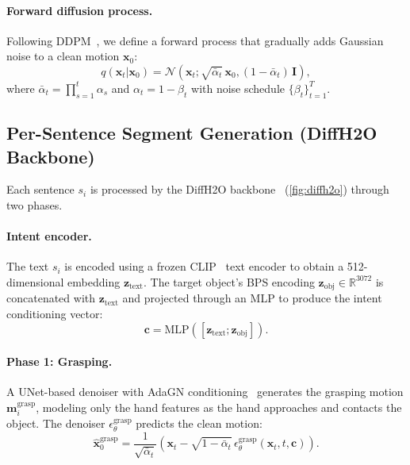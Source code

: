 \documentclass[runningheads]{llncs}
\newcommand{\bx}{\mathbf{x}}
\newcommand{\bc}{\mathbf{c}}
\newcommand{\bz}{\mathbf{z}}
\newcommand{\bm}{\mathbf{m}}
\begin{document}
\paragraph{Forward diffusion process.}
Following DDPM~\cite{ho2020denoising}, we define a forward process that gradually adds Gaussian noise to a clean motion $\bx_0$:
\begin{equation}
    q(\bx_t | \bx_0) = \mathcal{N}(\bx_t; \sqrt{\bar{\alpha}_t}\, \bx_0, (1 - \bar{\alpha}_t)\, \mathbf{I}),
    \label{eq:forward}
\end{equation}
where $\bar{\alpha}_t = \prod_{s=1}^{t} \alpha_s$ and $\alpha_t = 1 - \beta_t$ with noise schedule $\{\beta_t\}_{t=1}^{T}$.


\subsection{Per-Sentence Segment Generation (DiffH2O Backbone)}
\label{sec:segment_gen}

Each sentence $s_i$ is processed by the DiffH2O backbone~\cite{christen2024diffh2o} (\cref{fig:diffh2o}) through two phases.

\paragraph{Intent encoder.}
The text $s_i$ is encoded using a frozen CLIP~\cite{radford2021learning} text encoder to obtain a 512-dimensional embedding $\bz_\text{text}$.
The target object's BPS encoding $\bz_\text{obj} \in \mathbb{R}^{3072}$ is concatenated with $\bz_\text{text}$ and projected through an MLP to produce the intent conditioning vector:
\begin{equation}
    \bc = \text{MLP}([\bz_\text{text}; \bz_\text{obj}]).
    \label{eq:intent}
\end{equation}

\paragraph{Phase 1: Grasping.}
A UNet-based denoiser with AdaGN conditioning~\cite{dhariwal2021diffusion} generates the grasping motion $\bm_i^\text{grasp}$, modeling only the hand features as the hand approaches and contacts the object.
The denoiser $\epsilon_\theta^\text{grasp}$ predicts the clean motion:
\begin{equation}
    \hat{\bx}_0^\text{grasp} = \frac{1}{\sqrt{\bar{\alpha}_t}}\left(\bx_t - \sqrt{1 - \bar{\alpha}_t}\, \epsilon_\theta^\text{grasp}(\bx_t, t, \bc)\right).
    \label{eq:grasp_denoise}
\end{equation}
\end{document}
